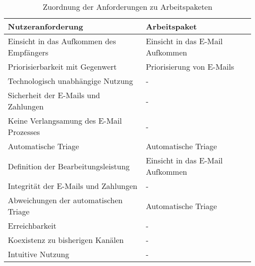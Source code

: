 \begin{table}[!h]
\centering
\caption[Arbeitspakete der Implementation]{Zuordnung der Anforderungen zu Arbeitspaketen}
\begin{tabular}{|l|l|}
\hline
\textbf{Nutzeranforderung}               & \textbf{Arbeitspaket}            \\ \hline
Einsicht in das Aufkommen des Empfängers & Einsicht in das E-Mail Aufkommen \\ \hline
Priorisierbarkeit mit Gegenwert          & Priorisierung von E-Mails        \\ \hline
Technologisch unabhängige Nutzung        & -                                \\ \hline
Sicherheit der E-Mails und Zahlungen     & -                                \\ \hline
Keine Verlangsamung des E-Mail Prozesses & -                                \\ \hline
Automatische Triage                      & Automatische Triage              \\ \hline
Definition der Bearbeitungsleistung      & Einsicht in das E-Mail Aufkommen \\ \hline
Integrität der E-Mails und Zahlungen     & -                                \\ \hline
Abweichungen der automatischen Triage    & Automatische Triage              \\ \hline
Erreichbarkeit                           & -                                \\ \hline
Koexistenz zu bisherigen Kanälen         & -                                \\ \hline
Intuitive Nutzung                        & -                                \\ \hline
\end{tabular}
\label{tab:arbeitspakete}
\end{table}

